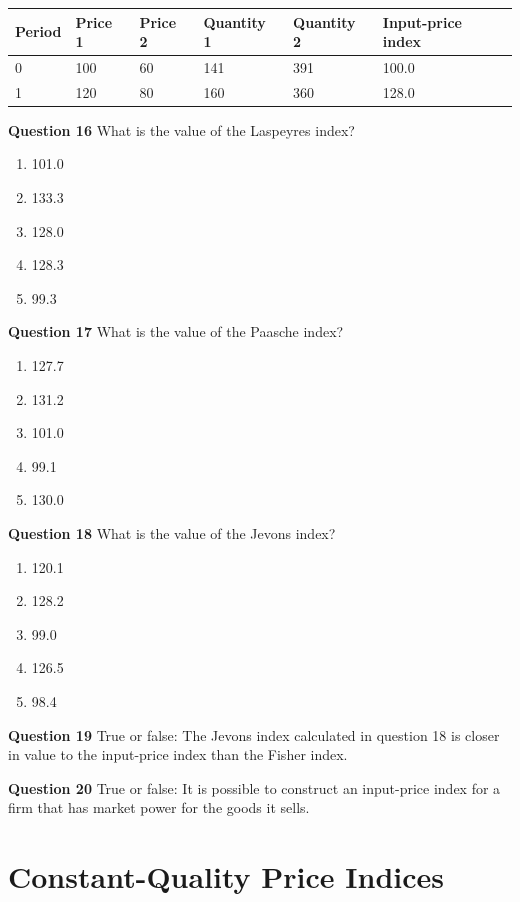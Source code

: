 \documentclass[]{article}
\begin{document}
\begin{longtable}[]{@{}llllll@{}}
\toprule
Period & Price 1 & Price 2 & Quantity 1 & Quantity 2 & Input-price index\tabularnewline
\midrule
\endhead
0 & 100 & 60 & 141 & 391 & 100.0\tabularnewline
1 & 120 & 80 & 160 & 360 & 128.0\tabularnewline
\bottomrule
\end{longtable}

\textbf{Question 16} What is the value of the Laspeyres index?

\begin{enumerate}
\def\labelenumi{\alph{enumi})}
\item
  101.0
\item
  133.3
\item
  128.0
\item
  128.3
\item
  99.3
\end{enumerate}

\textbf{Question 17} What is the value of the Paasche index?

\begin{enumerate}
\def\labelenumi{\alph{enumi})}
\item
  127.7
\item
  131.2
\item
  101.0
\item
  99.1
\item
  130.0
\end{enumerate}

\textbf{Question 18} What is the value of the Jevons index?

\begin{enumerate}
\def\labelenumi{\alph{enumi})}
\item
  120.1
\item
  128.2
\item
  99.0
\item
  126.5
\item
  98.4
\end{enumerate}

\textbf{Question 19} True or false: The Jevons index calculated in question 18 is closer in value to the input-price index than the Fisher index.

\textbf{Question 20} True or false: It is possible to construct an input-price index for a firm that has market power for the goods it sells.

\hypertarget{part-constant-quality-price-indices}{%
\part{Constant-Quality Price Indices}\label{part-constant-quality-price-indices}}
\end{document}
